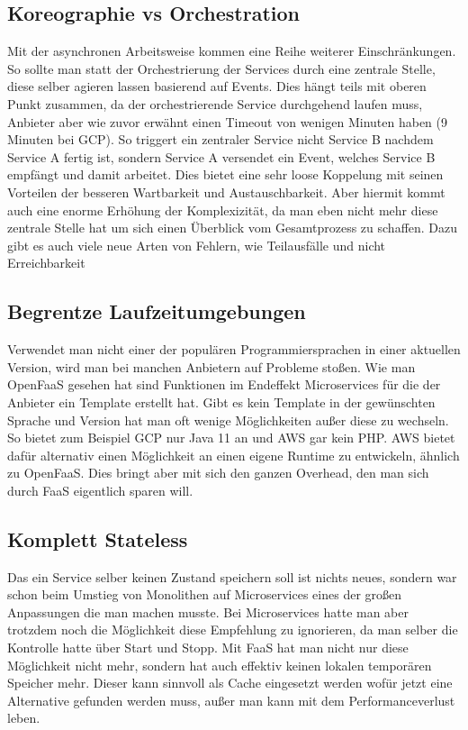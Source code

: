 \documentclass[12pt, a4paper]{article}
\begin{document}
\subsection{Koreographie vs Orchestration}
Mit der asynchronen Arbeitsweise kommen eine Reihe weiterer Einschränkungen.
So sollte man statt der Orchestrierung der Services durch eine zentrale Stelle, diese selber agieren lassen basierend auf Events.
Dies hängt teils mit oberen Punkt zusammen, da der orchestrierende Service durchgehend laufen muss, Anbieter aber wie zuvor erwähnt einen Timeout von wenigen Minuten haben (9 Minuten bei \ac{GCP}).
So triggert ein zentraler Service nicht Service B nachdem Service A fertig ist, sondern Service A versendet ein Event, welches Service B empfängt und damit arbeitet.
Dies bietet eine sehr loose Koppelung mit seinen Vorteilen der besseren Wartbarkeit und Austauschbarkeit.
Aber hiermit kommt auch eine enorme Erhöhung der Komplexizität, da man eben nicht mehr diese zentrale Stelle hat um sich einen Überblick vom Gesamtprozess zu schaffen.
Dazu gibt es auch viele neue Arten von Fehlern, wie Teilausfälle und nicht Erreichbarkeit
\subsection{Begrentze Laufzeitumgebungen}
Verwendet man nicht einer der populären Programmiersprachen in einer aktuellen Version, wird man bei manchen Anbietern auf Probleme stoßen.
Wie man OpenFaaS gesehen hat sind Funktionen im Endeffekt Microservices für die der Anbieter ein Template erstellt hat.
Gibt es kein Template in der gewünschten Sprache und Version hat man oft wenige Möglichkeiten außer diese zu wechseln.
So bietet zum Beispiel \ac{GCP} nur Java 11 an und \ac{AWS} gar kein PHP.
\ac{AWS} bietet dafür alternativ einen Möglichkeit an einen eigene Runtime zu entwickeln, ähnlich zu OpenFaaS.
Dies bringt aber mit sich den ganzen Overhead, den man sich durch \ac{FaaS} eigentlich sparen will.
\subsection{Komplett Stateless}
Das ein Service selber keinen Zustand speichern soll ist nichts neues, sondern war schon beim Umstieg von Monolithen auf Microservices eines der großen Anpassungen die man machen musste.
Bei Microservices hatte man aber trotzdem noch die Möglichkeit diese Empfehlung zu ignorieren, da man selber die Kontrolle hatte über Start und Stopp.
Mit \ac{FaaS} hat man nicht nur diese Möglichkeit nicht mehr, sondern hat auch effektiv keinen lokalen temporären Speicher mehr.
Dieser kann sinnvoll als Cache eingesetzt werden wofür jetzt eine Alternative gefunden werden muss, außer man kann mit dem Performanceverlust leben.
\end{document}

